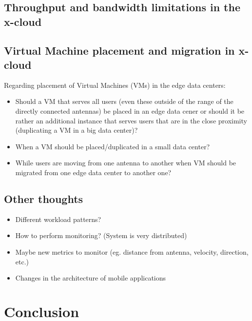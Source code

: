 \documentclass[conference]{IEEEtran}
\newcommand{\xcloud}{x-cloud }
\begin{document}
\subsection{Throughput and bandwidth limitations in the \xcloud}

\subsection{Virtual Machine placement and migration in \xcloud}

Regarding placement of Virtual Machines (VMs) in the edge data centers:
\begin{itemize}
\item Should a VM that serves all users (even these outside of the range of the directly connected antennas) be placed in an edge data cener or should it be rather an additional instance that serves users that are in the close proximity (duplicating a VM in a big data center)?
\item When a VM should be placed/duplicated in a small data center?
\item While users are moving from one antenna to another when VM should be migrated from one edge data center to another one?
\end{itemize}

\subsection{Other thoughts} 

\begin{itemize}
\item Different workload patterns?
\item How to perform monitoring? (System is very distributed)
\item Maybe new metrics to monitor (eg. distance from antenna, velocity, direction, etc.)
\item Changes in the architecture of mobile applications
\end{itemize}

\section{Conclusion}




\end{document}
